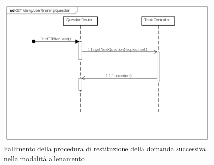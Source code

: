 \begin{itemize}
\begin{figure}[ht]
	\centering
	\includegraphics[scale=0.45]{UML/DiagrammiDiSequenza/Back-end/GET__lang_user_training_question_failure.png}
	\caption{Fallimento della procedura di restituzione della domanda successiva nella modalità allenamento}
\end{figure}
\FloatBarrier

\end{itemize}


